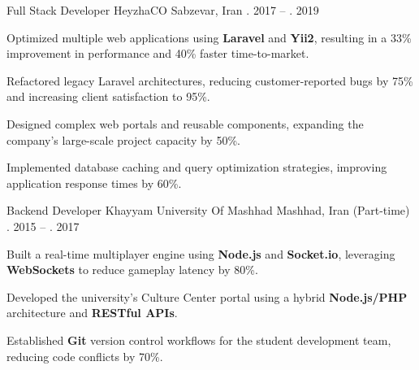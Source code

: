 \begin{cventries}
\cventry
{Full Stack Developer} %
{HeyzhaCO} %
{Sabzevar, Iran} %
{\shortmonthname[09]. 2017 -- \shortmonthname[01]. 2019} %
{
	\begin{cvitems}
		\item {Optimized multiple web applications using \textbf{Laravel} and \textbf{Yii2}, resulting in a 33\% improvement in performance and 40\% faster time-to-market.}
		\item {Refactored legacy Laravel architectures, reducing customer-reported bugs by 75\% and increasing client satisfaction to 95\%.}
		\item {Designed complex web portals and reusable components, expanding the company’s large-scale project capacity by 50\%.}
		\item {Implemented database caching and query optimization strategies, improving application response times by 60\%.}
	\end{cvitems}
}

\cventry
{Backend Developer} %
{Khayyam University Of Mashhad} %
{Mashhad, Iran (Part-time)} %
{\shortmonthname[01]. 2015 -- \shortmonthname[09]. 2017} %
{
	\begin{cvitems}
		\item {Built a real-time multiplayer engine using \textbf{Node.js} and \textbf{Socket.io}, leveraging \textbf{WebSockets} to reduce gameplay latency by 80\%.}
		\item {Developed the university's Culture Center portal using a hybrid \textbf{Node.js/PHP} architecture and \textbf{RESTful APIs}.}
		\item {Established \textbf{Git} version control workflows for the student development team, reducing code conflicts by 70\%.}
	\end{cvitems}
}
\end{cventries}

\vspace{1cm}